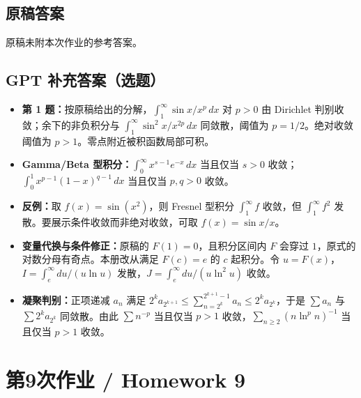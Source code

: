 \documentclass[UTF8,11pt, a4paper, oneside, fontset=none]{ctexbook}
\begin{document}
\subsection*{原稿答案}
\noindent 原稿未附本次作业的参考答案。
\clearpage
\subsection*{GPT 补充答案（选题）}
\begin{itemize}
\item \textbf{第 1 题：}按原稿给出的分解，$\int_1^\infty\sin x/x^p\,dx$ 对 $p>0$ 由 Dirichlet 判别收敛；余下的非负积分与 $\int_1^\infty\sin^2x/x^{2p}\,dx$ 同敛散，阈值为 $p=1/2$。绝对收敛阈值为 $p>1$。零点附近被积函数局部可积。
\item \textbf{Gamma/Beta 型积分：}$\int_0^\infty x^{s-1}e^{-x}\,dx$ 当且仅当 $s>0$ 收敛；$\int_0^1x^{p-1}(1-x)^{q-1}\,dx$ 当且仅当 $p,q>0$ 收敛。
\item \textbf{反例：}取 $f(x)=\sin(x^2)$，则 Fresnel 型积分 $\int_1^\infty f$ 收敛，但 $\int_1^\infty f^2$ 发散。要展示条件收敛而非绝对收敛，可取 $f(x)=\sin x/x$。
\item \textbf{变量代换与条件修正：}原稿的 $F(1)=0$，且积分区间内 $F$ 会穿过 $1$，原式的对数分母有奇点。本册改从满足 $F(c)=e$ 的 $c$ 起积分。令 $u=F(x)$，$I=\int_e^\infty du/(u\ln u)$ 发散，$J=\int_e^\infty du/(u\ln^2u)$ 收敛。
\item \textbf{凝聚判别：}正项递减 $a_n$ 满足 $2^ka_{2^{k+1}}\le\sum_{n=2^k}^{2^{k+1}-1}a_n\le2^ka_{2^k}$，于是 $\sum a_n$ 与 $\sum2^ka_{2^k}$ 同敛散。由此 $\sum n^{-p}$ 当且仅当 $p>1$ 收敛，$\sum_{n\ge2}(n\ln^p n)^{-1}$ 当且仅当 $p>1$ 收敛。
\end{itemize}
\clearpage
\section{第9次作业 / Homework 9}
\end{document}
